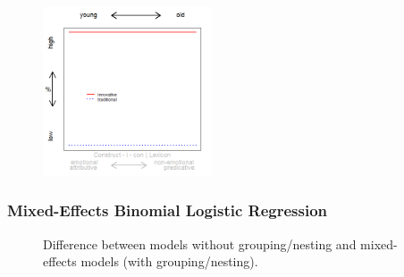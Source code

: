\documentclass[12pt, table]{beamer}
\begin{document}
\begin{frame}
\begin{minipage}[t]{\linewidth}
\begin{minipage}{.45\linewidth}
\begin{tabular}{cccccccccc }
\end{tabular}
\end{minipage}
\hfill
\begin{minipage}{.45\linewidth}
\begin{figure}
\includegraphics[width=5cm]{images/LangChang22.png}
\end{figure}
\end{minipage}
\end{minipage}
\end{frame}

\begin{frame}
\frametitle{Mixed-Effects Binomial Logistic Regression}
\textcolor{gray}{\begin{scriptsize}\citep{baayen2008analyzing, faraway2016extending}\end{scriptsize}}
\begin{center}
\begin{figure}
\begin{footnotesize}
\caption{Difference between models without grouping/nesting and mixed-effects models (with grouping/nesting).}
\end{footnotesize}
\end{figure}
\end{center}
\end{frame}
\end{document}
